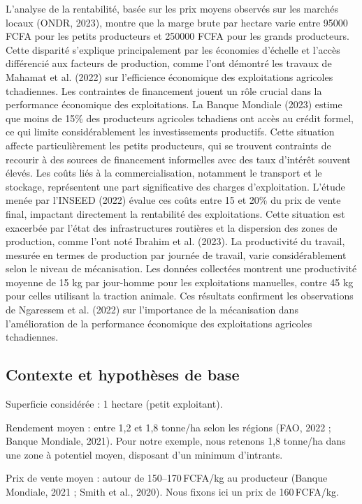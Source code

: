 \documentclass[12pt,oneside]{report}
\begin{document}
L'analyse de la rentabilité, basée sur les prix moyens observés sur les marchés locaux (ONDR, 2023), montre que la marge brute par hectare varie entre 95000 FCFA pour les petits producteurs et 250000 FCFA pour les grands producteurs. Cette disparité s'explique principalement par les économies d'échelle et l'accès différencié aux facteurs de production, comme l'ont démontré les travaux de Mahamat et al. (2022) sur l'efficience économique des exploitations agricoles tchadiennes. Les contraintes de financement jouent un rôle crucial dans la performance économique des exploitations. La Banque Mondiale (2023) estime que moins de 15\% des producteurs agricoles tchadiens ont accès au crédit formel, ce qui limite considérablement les investissements productifs. Cette situation affecte particulièrement les petits producteurs, qui se trouvent contraints de recourir à des sources de financement informelles avec des taux d'intérêt souvent élevés. Les coûts liés à la commercialisation, notamment le transport et le stockage, représentent une part significative des charges d'exploitation. L'étude menée par l'INSEED (2022) évalue ces coûts entre 15 et 20\% du prix de vente final, impactant directement la rentabilité des exploitations. Cette situation est exacerbée par l'état des infrastructures routières et la dispersion des zones de production, comme l'ont noté Ibrahim et al. (2023). La productivité du travail, mesurée en termes de production par journée de travail, varie considérablement selon le niveau de mécanisation. Les données collectées montrent une productivité moyenne de 15 kg par jour-homme pour les exploitations manuelles, contre 45 kg pour celles utilisant la traction animale. Ces résultats confirment les observations de Ngaressem et al. (2022) sur l'importance de la mécanisation dans l'amélioration de la performance économique des exploitations agricoles tchadiennes.

\subsection{Contexte et hypothèses de base}
Superficie considérée : 1 hectare (petit exploitant).

Rendement moyen : entre 1,2 et 1,8 tonne/ha selon les régions (FAO, 2022 ; Banque Mondiale, 2021). Pour notre exemple, nous retenons 1,8 tonne/ha dans une zone à potentiel moyen, disposant d’un minimum d’intrants.

Prix de vente moyen : autour de 150–170 FCFA/kg au producteur (Banque Mondiale, 2021 ; Smith et al., 2020). Nous fixons ici un prix de 160 FCFA/kg.
\end{document}
